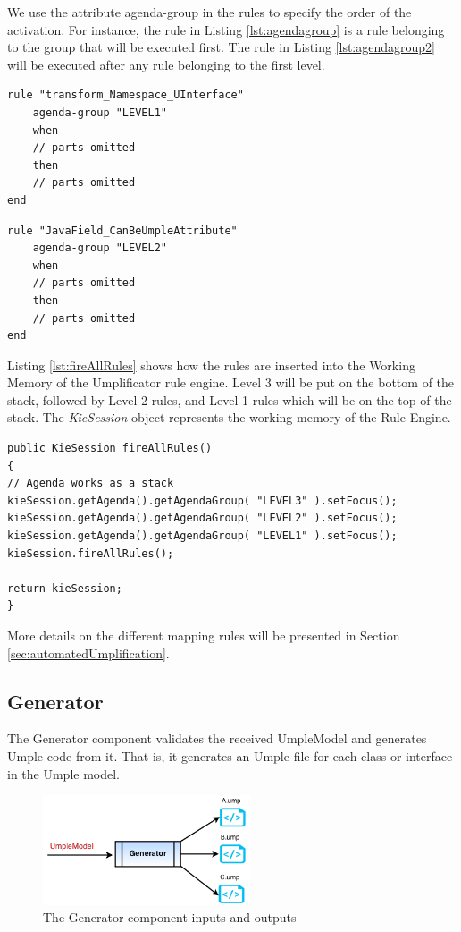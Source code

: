 We use the attribute agenda-group in the rules to specify the order of the activation. For instance, the rule in Listing \ref{lst:agendagroup} is a rule belonging to the group that will be executed first. The rule in Listing \ref{lst:agendagroup2} will be executed after any rule belonging to the first level. 

\begin{lstlisting}[language={drools},label={lst:agendagroup}, caption=A rule belonging to Level 1] 
rule "transform_Namespace_UInterface"
	agenda-group "LEVEL1" 
	when
	// parts omitted
	then
	// parts omitted
end
\end{lstlisting}

\begin{lstlisting}[language={drools},label={lst:agendagroup2}, caption=A rule belonging to Level 2] 
rule "JavaField_CanBeUmpleAttribute"
	agenda-group "LEVEL2" 
	when
	// parts omitted
	then
	// parts omitted
end
\end{lstlisting}

Listing \ref{lst:fireAllRules} shows how the rules are inserted into the Working Memory of the Umplificator rule engine. Level 3 will be put on the bottom of the stack, followed by Level 2 rules, and Level 1 rules which will be on the top of the stack. The \textit{KieSession} object represents the working memory of the Rule Engine.

\begin{lstlisting}[style=java, caption=Firing the rules in the Umplificator, label=lst:fireAllRules]
public KieSession fireAllRules()
{
// Agenda works as a stack
kieSession.getAgenda().getAgendaGroup( "LEVEL3" ).setFocus();
kieSession.getAgenda().getAgendaGroup( "LEVEL2" ).setFocus();
kieSession.getAgenda().getAgendaGroup( "LEVEL1" ).setFocus();
kieSession.fireAllRules();

return kieSession;
}
\end{lstlisting}

More details on the different mapping rules will be presented in Section \ref{sec:automatedUmplification}.

\subsection{Generator}

The Generator component validates the received UmpleModel and generates Umple code from it. That is, it generates an Umple file for each class or interface in the Umple model.

\begin{figure}[h]
\centering
\includegraphics[width=0.55\textwidth]{Figures/generatorINOut.png}
\caption{The Generator component inputs and outputs}
\label{fig:generatorInOut}
\end{figure}

